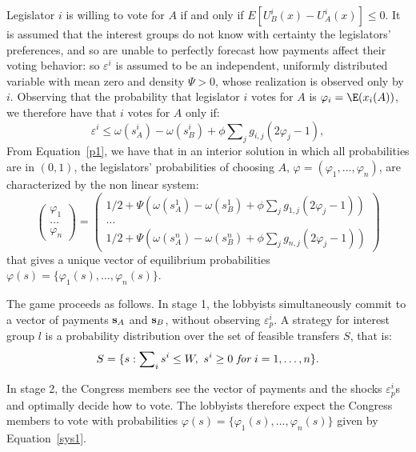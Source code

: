 \documentclass[nojss]{jss}
\begin{document}
Legislator $i$ is willing to vote for $A$ if and only if $E\left[
U_{B}^{i}(x)-U_{A}^{i}(x)\right] \leq 0$.  It is assumed that the interest
groups do not know with certainty the legislators' preferences, and so are
unable to perfectly forecast how payments affect their voting behavior: so
$\varepsilon ^{i}$ is assumed to be an independent, uniformly distributed
variable with mean zero and density $\Psi >0$, whose realization is observed
only by $i$.  Observing that the probability that legislator $i$ votes for
$A$ is $\varphi _{i}=\E(x_{i}(A))$, we therefore have that $i$ votes for $A$
only if:
%
\begin{equation}
\varepsilon^{i}\leq \omega (s_{A}^{i})-\omega (s_{B}^{i})+\phi
\sum\nolimits_{j}g_{i,j}\left( 2\varphi _{j}-1\right) ,  \label{p1}
\end{equation}%
%
From Equation~\ref{p1}, we have that in an interior solution in which all
probabilities are in $(0,1)$, the legislators' probabilities of choosing
$A$, $\varphi =(\varphi _{1},\dots,\varphi _{n})$, are characterized by the
non linear system:
%
\begin{equation}
\left( 
\begin{array}{c}
\varphi _{1} \\ 
\dots \\ 
\varphi _{n}%
\end{array}%
\right) =\left( 
\begin{array}{c}
1/2+\Psi \left( \omega (s_{A}^{1})-\omega (s_{B}^{1})+\phi
\sum\nolimits_{j}g_{1,j}\left( 2\varphi _{j}-1\right) \right) \\ 
\dots \\ 
1/2+\Psi \left( \omega (s_{A}^{n})-\omega (s_{B}^{n})+\phi
\sum\nolimits_{j}g_{n,j}\left( 2\varphi _{j}-1\right) \right)%
\end{array}%
\right)  \label{sys1}
\end{equation}%
%
that gives a unique vector of equilibrium probabilities $\varphi
(s)=\{\varphi _{1}(s),\dots,\varphi _{n}(s)\}$.

The game proceeds as follows.  In stage 1, the lobbyists simultaneously
commit to a vector of payments ${\bf s}_{A}$ and ${\bf s}_{B}$, without
observing $\varepsilon^{i}_{p}$.  A strategy for interest group $l$
is a probability distribution over the set of feasible transfers $S$, that
is: \[S=\{s:\sum\nolimits_{i}s^{i}\leq W,\text{ }s^{i}\geq 0\text{ {\it for}
} i=1,\dots,n\}.\]

In stage 2, the Congress members see the vector of payments and the shocks
$\varepsilon^{i}_{p}$s and optimally decide how to vote.  The lobbyists
therefore expect the Congress members to vote with probabilities $\varphi
(s)=\{\varphi _{1}(s),\dots,\varphi _{n}(s)\}$ given by Equation~\ref{sys1}.
\end{document}
